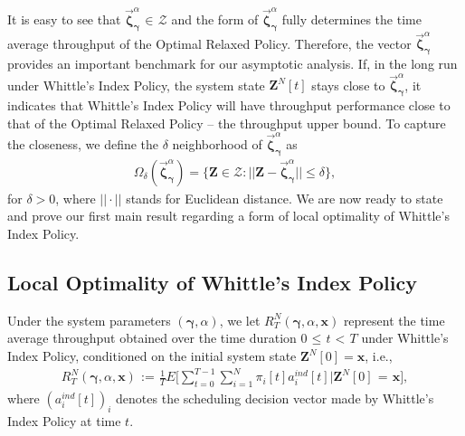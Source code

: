 \documentclass[11pt,twocolumn]{IEEEtran}
\begin{document}
It is easy to see that $\vec{\bm \zeta}^{\alpha}_{\bm \gamma} \hspace{1pt}{\in}\hspace{1pt}
\mathcal{Z}$ and the form of $\vec{\bm \zeta}^{\alpha}_{\bm \gamma}$
fully determines the time average throughput of the Optimal Relaxed
Policy. Therefore, the vector $\vec{\bm \zeta}^{\alpha}_{\bm
\gamma}$ provides an important benchmark for our asymptotic
analysis. If, in the long run under Whittle's Index Policy, the system state ${\bm Z}^N[t]$ stays close to
$\vec{\bm \zeta}^{\alpha}_{\bm \gamma}$, it indicates that Whittle's Index Policy will have throughput performance close to
that of the Optimal Relaxed Policy -- the throughput upper bound. To
capture the closeness, we define the $\delta$ neighborhood of
$\vec{\bm \zeta}^{\alpha}_{\bm \gamma}$ as
\begin{align}
\label{eq:nbhd} \Omega_{\delta}(\vec{\bm \zeta}^{\alpha}_{\bm
\gamma})= \{{\bm Z} \in \mathcal{Z}: ||{\bm Z}- \vec{\bm
\zeta}^{\alpha}_{\bm \gamma}||\leq \delta \},
\end{align}
for $\delta>0$, where $||\cdot||$ stands for Euclidean distance. We
are now ready to state and prove our first main result regarding a
form of local optimality of Whittle's Index Policy.



\subsection{Local Optimality of Whittle's Index Policy}
Under the system parameters $(\bm \gamma, \alpha)$, we let
$R_{T}^{N}(\bm \gamma, \alpha, \bm x)$ represent the time average
throughput obtained over the time duration $0
\hspace{1pt}{\leq}\hspace{1pt} t \hspace{1pt}{<}\hspace{1pt} T$
under Whittle's Index Policy, conditioned on the initial system
state ${\bm Z}^N[0]=\bm x$, i.e.,
\begin{align}
\nonumber R_{T}^{N}(\bm \gamma, \alpha, \bm
x)\hspace{1pt}{:=}\hspace{1pt}\frac{1}{T}E \Big[\sum_{t=0}^{T-1}
\sum_{i=1}^{N} \pi_i[t] a_i^{ind}[t] \Big| {\bm Z}^N
[0]\hspace{1pt}{=}\hspace{1pt}\bm x \Big],
\end{align}
where $(a_i^{ind}[t])_i$ denotes the scheduling decision vector made
by Whittle's Index Policy at time $t.$
\end{document}

